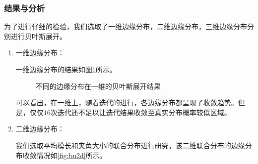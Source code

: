 \documentclass[aps,pre,12pt,preprint,onecolumn,showpacs,showkeys]{revtex4-1}
\begin{document}
\subsubsection{结果与分析}
为了进行仔细的检验，我们选取了一维边缘分布，二维边缘分布，三维边缘分布分别进行贝叶斯展开。
\begin{enumerate}
    \item 一维边缘分布：\par
    一维边缘分布的结果如图\ref{fig:bu1d}所示。\par
    \begin{figure}[htbp]
    \centering
    \caption{不同的边缘分布在一维的贝叶斯展开结果\label{fig:bu1d}}%
    \end{figure}
    可以看出，在一维上，随着迭代的进行，各边缘分布都呈现了收敛趋势。但是，仅仅$16$次迭代还不足以让迭代结果收敛至真实分布概率较低区域。
    \item 二维边缘分布：\par
    我们选取平均模长和夹角大小的联合分布进行研究，该二维联合分布的边缘分布收敛情况如\ref{fig:bu2d}所示。\par
    \begin{figure}[htbp]

\end{figure}
\end{enumerate}
\end{document}
